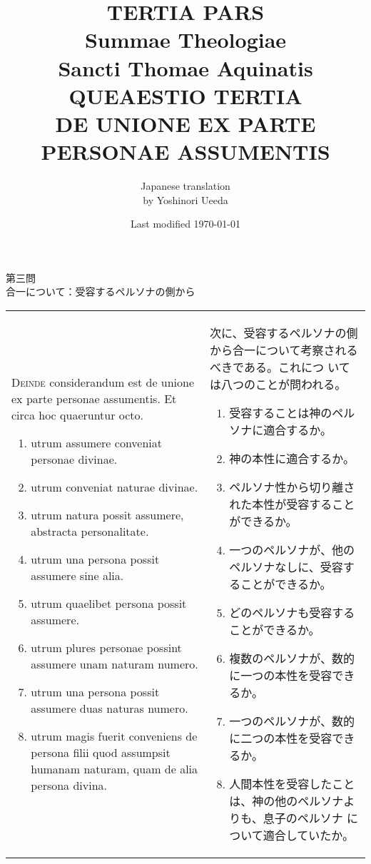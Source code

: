 \documentclass[10pt]{jsarticle} %
\title{{\bf TERTIA PARS}\\{\HUGE Summae Theologiae}\\Sancti Thomae
Aquinatis\\{\sffamily QUEAESTIO TERTIA}\\DE UNIONE EX PARTE PERSONAE
ASSUMENTIS}
\author{Japanese translation\\by Yoshinori {\sc Ueeda}}
\date{Last modified \today}
\begin{document}
\maketitle
\pagestyle{fancy}



\begin{center}
{\Large 第三問\\合一について：受容するペルソナの側から}
\end{center}



\begin{longtable}{p{21em}p{21em}}




{\Huge D}{\scshape einde} considerandum est de unione ex parte personae assumentis. Et
circa hoc quaeruntur octo. 


\begin{enumerate}
 \item utrum assumere conveniat personae divinae.
 \item utrum conveniat naturae divinae. 
 \item utrum natura possit assumere, abstracta personalitate.
 \item utrum una persona possit assumere sine alia.
 \item utrum quaelibet persona possit assumere.
 \item utrum plures personae possint assumere unam naturam numero. 
 \item utrum una persona possit assumere duas naturas numero.
 \item utrum magis fuerit conveniens de persona filii quod assumpsit humanam naturam, quam de alia persona divina.
\end{enumerate}


&

次に、受容するペルソナの側から合一について考察されるべきである。これにつ
 いては八つのことが問われる。

\begin{enumerate}
 \item 受容することは神のペルソナに適合するか。
 \item 神の本性に適合するか。
 \item ペルソナ性から切り離された本性が受容することができるか。
 \item 一つのペルソナが、他のペルソナなしに、受容することができるか。
 \item どのペルソナも受容することができるか。
 \item 複数のペルソナが、数的に一つの本性を受容できるか。
 \item 一つのペルソナが、数的に二つの本性を受容できるか。
 \item 人間本性を受容したことは、神の他のペルソナよりも、息子のペルソナ
       について適合していたか。
\end{enumerate}

\end{longtable}
\newpage
\end{document}
